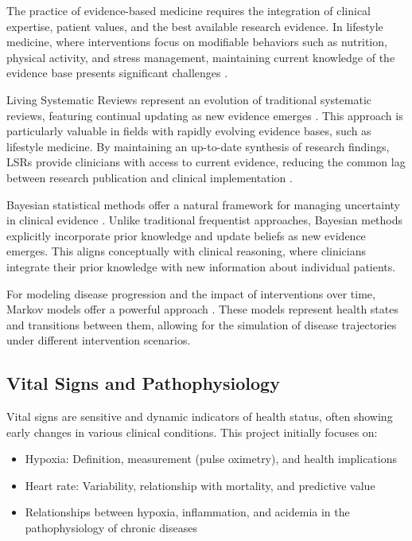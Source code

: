 The practice of evidence-based medicine requires the integration of clinical expertise, patient values, and the best available research evidence. In lifestyle medicine, where interventions focus on modifiable behaviors such as nutrition, physical activity, and stress management, maintaining current knowledge of the evidence base presents significant challenges \cite{clayton2023foundations}.

Living Systematic Reviews represent an evolution of traditional systematic reviews, featuring continual updating as new evidence emerges \cite{elliott2014living}. This approach is particularly valuable in fields with rapidly evolving evidence bases, such as lifestyle medicine. By maintaining an up-to-date synthesis of research findings, LSRs provide clinicians with access to current evidence, reducing the common lag between research publication and clinical implementation \cite{elliott2017living}.

Bayesian statistical methods offer a natural framework for managing uncertainty in clinical evidence \cite{spiegelhalter2004bayesian}. Unlike traditional frequentist approaches, Bayesian methods explicitly incorporate prior knowledge and update beliefs as new evidence emerges. This aligns conceptually with clinical reasoning, where clinicians integrate their prior knowledge with new information about individual patients.

For modeling disease progression and the impact of interventions over time, Markov models offer a powerful approach \cite{sonnenberg1993markov}. These models represent health states and transitions between them, allowing for the simulation of disease trajectories under different intervention scenarios.

\subsection{Vital Signs and Pathophysiology}

Vital signs are sensitive and dynamic indicators of health status, often showing early changes in various clinical conditions. This project initially focuses on:

\begin{itemize}
\item Hypoxia: Definition, measurement (pulse oximetry), and health implications
\item Heart rate: Variability, relationship with mortality, and predictive value
\item Relationships between hypoxia, inflammation, and acidemia in the pathophysiology of chronic diseases
\end{itemize}

